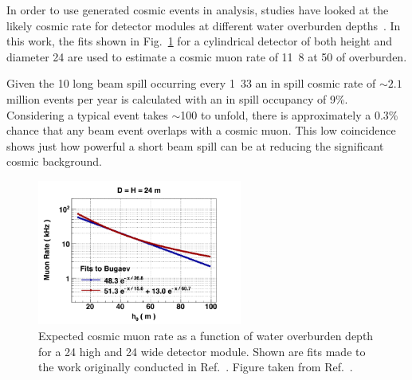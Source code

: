 In order to use generated cosmic events in analysis, studies have looked at the likely cosmic rate
for \chips detector modules at different water overburden depths~\cite{son2013}. In this work, the
fits shown in Fig.~\ref{fig:cosmic_rate} for a cylindrical detector of both height and diameter
\unit{24}{} are used to estimate a \chipsfive cosmic muon rate of
\unit{11.8}{} at \unit{50}{} of overburden.

Given the \unit{10}{\mu{}} long \numi beam spill occurring every \unit{1.33}{}
an in spill cosmic rate of $\sim2.1$ million events per year is calculated with an in spill
occupancy of 9\%. Considering a typical event takes $\sim$\unit{100}{} to unfold, there
is approximately a 0.3\% chance that any beam event overlaps with a cosmic muon. This low
coincidence shows just how powerful a short beam spill can be at reducing the significant cosmic
background.

\begin{figure} %
    \includegraphics[width=0.6\textwidth]{diagrams/4-chips/cosmic_rate.png}
    \caption[Expected \chipsfive cosmic muon rate as a function of water overburden depth]
    {Expected cosmic muon rate as a function of water overburden depth for a \unit{24}{}
        high and \unit{24}{} wide \chips detector module. Shown are fits made to the
        work originally conducted in Ref.~\cite{bugaev1998}. Figure taken from
        Ref.~\cite{son2013}.}
    \label{fig:cosmic_rate}
\end{figure}